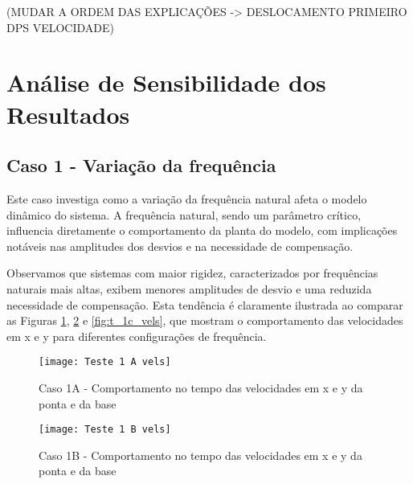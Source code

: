     

(MUDAR A ORDEM DAS EXPLICAÇÕES -> DESLOCAMENTO PRIMEIRO DPS VELOCIDADE)

\section{Análise de Sensibilidade dos Resultados}
\subsection{Caso 1 - Variação da frequência}
Este caso investiga como a variação da frequência natural afeta o modelo dinâmico do sistema. A frequência natural, sendo um parâmetro crítico, influencia diretamente o comportamento da planta do modelo, com implicações notáveis nas amplitudes dos desvios e na necessidade de compensação.

Observamos que sistemas com maior rigidez, caracterizados por frequências naturais mais altas, exibem menores amplitudes de desvio e uma reduzida necessidade de compensação. Esta tendência é claramente ilustrada ao comparar as Figuras \ref{fig:t_1a_vels}, \ref{fig:t_1b_vels} e \ref{fig:t_1c_vels}, que mostram o comportamento das velocidades em x e y para diferentes configurações de frequência.

\begin{figure}[H]
    \begin{center}
    \caption{Caso 1A - Comportamento no tempo das velocidades em x e y da ponta e da base}
    \texttt{[image: Teste 1 A vels]}
    \label{fig:t_1a_vels}
    \end{center}
\end{figure}

\begin{figure}[H]
    \begin{center}
    \caption{Caso 1B - Comportamento no tempo das velocidades em x e y da ponta e da base}
    \texttt{[image: Teste 1 B vels]}
    \label{fig:t_1b_vels}
    \end{center}
\end{figure}

